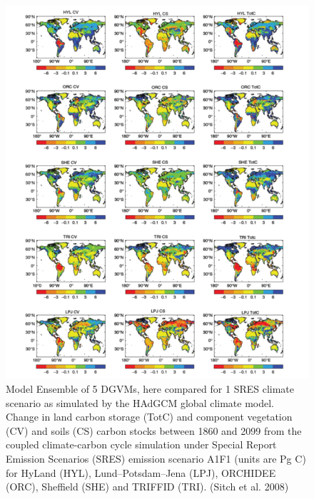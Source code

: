 \documentclass[12pt,oneside]{book}
\begin{document}
\begin{figure}

{\centering \includegraphics[width=0.8\linewidth]{figures/chap10/f10_9_sitch_ensemble} 

}

\caption{Model Ensemble of 5 DGVMs, here compared for 1 SRES climate scenario as simulated by the HAdGCM global climate model. Change in land carbon storage (TotC) and component vegetation (CV) and soils (CS) carbon stocks between 1860 and 2099 from the coupled climate-carbon cycle simulation under Special Report Emission Scenarios (SRES) emission scenario A1F1 (units are Pg C) for HyLand (HYL), Lund–Potsdam–Jena (LPJ), ORCHIDEE (ORC), Sheffield (SHE) and TRIFFID (TRI). (Sitch et al. 2008)}\label{fig:f109}
\end{figure}
\end{document}
